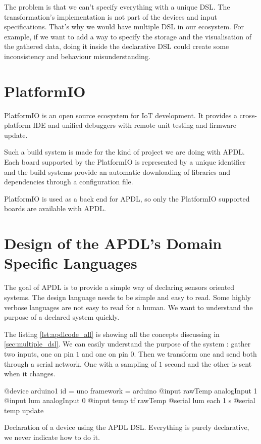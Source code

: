 The problem is that we can't specify everything with a unique \gls{DSL}. The
transformation's implementation is not part of the devices and input
specifications. That's why we would have multiple \gls{DSL} in our ecosystem.
For example, if we want to add a way to specify the storage and the
visualisation of the gathered data, doing it inside the declarative \gls{DSL}
could create some inconsistency and behaviour misunderstanding.

\section{PlatformIO}
\label{sec:platformio}

PlatformIO\cite{Ivan2017} is an open source ecosystem for IoT development. It
provides a cross-platform IDE and unified debuggers with remote unit testing and
firmware update\cite{Ivan2017}.

Such a build system is made for the kind of project we are doing with
\gls{APDL}. Each board supported by the PlatformIO is represented by a unique
identifier and the build systems provide an automatic downloading of libraries
and dependencies through a configuration file.

PlatformIO is used as a back end for \gls{APDL}, so only the PlatformIO
supported boards are available with \gls{APDL}.

\section{Design of the APDL's Domain Specific Languages}
\label{sec:design_apdl_dsls}

The goal of \gls{APDL} is to provide a simple way of declaring sensors oriented
systems. The design language needs to be simple and easy to read. Some highly
verbose languages are not easy to read for a human. We want to understand the
purpose of a declared system quickly.

The listing \ref{lst:apdlcode_all} is showing all the concepts discussing in
\ref{sec:multiple_dsl}. We can easily understand the purpose of the system :
gather two inputs, one on pin $1$ and one on pin $0$. Then we transform one and
send both through a serial network. One with a sampling of $1$ second and the
other is sent when it changes.

\begin{listing}[H]
  \centering
\begin{apdlcode}
@device arduino1 {
    id = uno
    framework = arduino
    @input rawTemp analogInput 1
    @input lum analogInput 0
    @input temp tf rawTemp
    @serial lum each 1 s
    @serial temp update
}
\end{apdlcode}
  \caption[Declaration of a device with the \gls{APDL} \gls{DSL}]{Declaration of
  a device using the \gls{APDL} \gls{DSL}. Everything is purely declarative, we
  never indicate how to do it.}
  \label{lst:apdlcode_all}
\end{listing}

